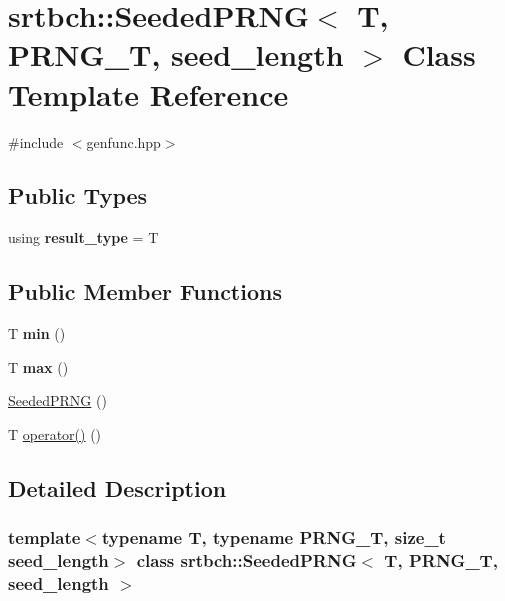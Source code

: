 \hypertarget{classsrtbch_1_1SeededPRNG}{}\section{srtbch\+:\+:Seeded\+P\+R\+NG$<$ T, P\+R\+N\+G\+\_\+T, seed\+\_\+length $>$ Class Template Reference}
\label{classsrtbch_1_1SeededPRNG}


{\ttfamily \#include $<$genfunc.\+hpp$>$}

\subsection*{Public Types}
\begin{DoxyCompactItemize}
\item 
\mbox{\label{classsrtbch_1_1SeededPRNG_a95682bcc5829b93c2b8e211ec0eeefd1}} 
using {\bfseries result\+\_\+type} = T
\end{DoxyCompactItemize}
\subsection*{Public Member Functions}
\begin{DoxyCompactItemize}
\item 
\mbox{\label{classsrtbch_1_1SeededPRNG_a90b8d33ec1999c0f922d52a15226128e}} 
T {\bfseries min} ()
\item 
\mbox{\label{classsrtbch_1_1SeededPRNG_a67d2ae5d5435bd719a351f56f633c2ba}} 
T {\bfseries max} ()
\item 
\hyperlink{classsrtbch_1_1SeededPRNG_ade7faf721a3b9d817886f3ed7eb263af}{Seeded\+P\+R\+NG} ()
\item 
T \hyperlink{classsrtbch_1_1SeededPRNG_aea9b901a9dc7ad6a7fe328ff291c72c1}{operator()} ()
\end{DoxyCompactItemize}


\subsection{Detailed Description}
\subsubsection*{template$<$typename T, typename P\+R\+N\+G\+\_\+T, size\+\_\+t seed\+\_\+length$>$\newline
class srtbch\+::\+Seeded\+P\+R\+N\+G$<$ T, P\+R\+N\+G\+\_\+\+T, seed\+\_\+length $>$}

